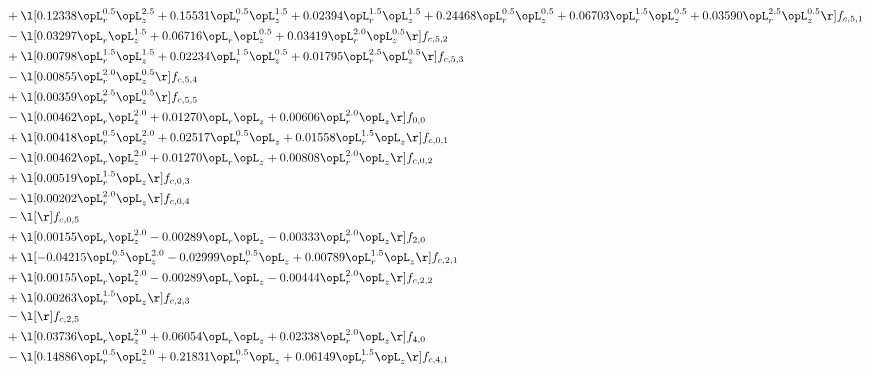 \begin{alignat}{2}
& + \l[  0.12338 \opL_r^{0.5} \opL_z^{2.5} +  0.15531 \opL_r^{0.5} \opL_z^{1.5} +  0.02394 \opL_r^{1.5} \opL_z^{1.5} +  0.24468 \opL_r^{0.5} \opL_z^{0.5} +  0.06703 \opL_r^{1.5} \opL_z^{0.5} +  0.03590 \opL_r^{2.5} \opL_z^{0.5}  \r] f_{c,5,1} \nonumber \\ 
& - \l[  0.03297 \opL_r \opL_z^{1.5} +  0.06716 \opL_r \opL_z^{0.5} +  0.03419 \opL_r^{2.0} \opL_z^{0.5}  \r] f_{c,5,2} \nonumber \\ 
& + \l[  0.00798 \opL_r^{1.5} \opL_z^{1.5} +  0.02234 \opL_r^{1.5} \opL_z^{0.5} +  0.01795 \opL_r^{2.5} \opL_z^{0.5}  \r] f_{c,5,3} \nonumber \\ 
& - \l[  0.00855 \opL_r^{2.0} \opL_z^{0.5}  \r] f_{c,5,4} \nonumber \\ 
& + \l[  0.00359 \opL_r^{2.5} \opL_z^{0.5}  \r] f_{c,5,5} \nonumber \\ 
& - \l[  0.00462 \opL_r \opL_z^{2.0} +  0.01270 \opL_r \opL_z +  0.00606 \opL_r^{2.0} \opL_z  \r] f_{0,0} \nonumber \\ 
& + \l[  0.00418 \opL_r^{0.5} \opL_z^{2.0} +  0.02517 \opL_r^{0.5} \opL_z +  0.01558 \opL_r^{1.5} \opL_z  \r] f_{c,0,1} \nonumber \\ 
& - \l[  0.00462 \opL_r \opL_z^{2.0} +  0.01270 \opL_r \opL_z +  0.00808 \opL_r^{2.0} \opL_z  \r] f_{c,0,2} \nonumber \\ 
& + \l[  0.00519 \opL_r^{1.5} \opL_z  \r] f_{c,0,3} \nonumber \\ 
& - \l[  0.00202 \opL_r^{2.0} \opL_z  \r] f_{c,0,4} \nonumber \\ 
& - \l[  \r] f_{c,0,5} \nonumber \\ 
& + \l[  0.00155 \opL_r \opL_z^{2.0}   -0.00289 \opL_r \opL_z   -0.00333 \opL_r^{2.0} \opL_z  \r] f_{2,0} \nonumber \\ 
& + \l[  -0.04215 \opL_r^{0.5} \opL_z^{2.0}   -0.02999 \opL_r^{0.5} \opL_z +  0.00789 \opL_r^{1.5} \opL_z  \r] f_{c,2,1} \nonumber \\ 
& + \l[  0.00155 \opL_r \opL_z^{2.0}   -0.00289 \opL_r \opL_z   -0.00444 \opL_r^{2.0} \opL_z  \r] f_{c,2,2} \nonumber \\ 
& + \l[  0.00263 \opL_r^{1.5} \opL_z  \r] f_{c,2,3} \nonumber \\ 
& - \l[  \r] f_{c,2,5} \nonumber \\ 
& + \l[  0.03736 \opL_r \opL_z^{2.0} +  0.06054 \opL_r \opL_z +  0.02338 \opL_r^{2.0} \opL_z  \r] f_{4,0} \nonumber \\ 
& - \l[  0.14886 \opL_r^{0.5} \opL_z^{2.0} +  0.21831 \opL_r^{0.5} \opL_z +  0.06149 \opL_r^{1.5} \opL_z  \r] f_{c,4,1} \nonumber \\ 

\end{alignat}

